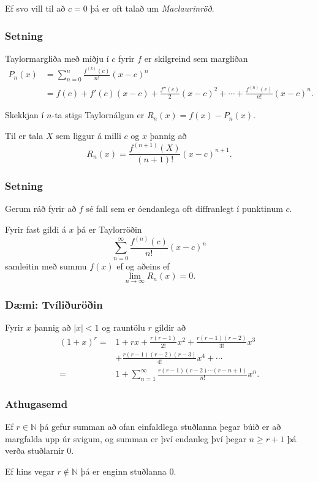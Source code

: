 \documentclass[icelandic,a4paper,12pt]{article}
\newcommand{\N}{{\mathbb  N}}
\begin{document}
Ef svo vill til að $c=0$ þá er oft talað um \emph{Maclaurinröð}.

\subsubsection{Setning}  
Taylormargliða með miðju í $c$ fyrir $f$ er skilgreind sem margliðan
\begin{align*}
  P_n(x)& =\sum_{n=0}^n \frac{f^{(k)}(c)}{n!}(x-c)^n \\
  &=f(c)+f'(c)(x-c)+ \frac{f''(c)}{2}(x-c)^2+\cdots+\frac{f^{(n)}(c)}{n!}(x-c)^n.
\end{align*}

Skekkjan í $n$-ta stigs Taylornálgun er $R_n(x)=f(x)-P_n(x)$.  

Til er tala $X$ sem liggur á milli $c$ og $x$ þannig að 
$$
R_n(x)=\frac{f^{(n+1)}(X)}{(n+1)!}(x-c)^{n+1}.
$$

\subsubsection{Setning}  
Gerum ráð fyrir að $f$ sé fall sem er óendanlega oft diffranlegt í punktinum $c$. 

Fyrir fast gildi á $x$ þá er Taylorröðin 
$$
\sum_{n=0}^\infty \frac{f^{(n)}(c)}{n!}(x-c)^n
$$ 
samleitin með summu $f(x)$  ef og aðeins ef 
$$
\lim_{n\rightarrow\infty}R_n(x)=0.
$$

\subsubsection{Dæmi: Tvíliðuröðin}
Fyrir $x$ þannig að $|x|<1$ og rauntölu $r$ gildir að 
\begin{align*}
(1+x)^r =& 1+rx+\frac{r(r-1)}{2!}x^2+ \frac{r(r-1)(r-2)}{3!}x^3 \\ 
&+\frac{r(r-1)(r-2)(r-3)}{4!}x^4+\cdots\\
=& 1+ \sum_{n=1}^\infty \frac{r(r-1)(r-2)\cdots(r-n+1)}{n!}x^n.
\end{align*}

\subsubsection{Athugasemd}
Ef $r \in \N$ þá gefur summan að ofan einfaldlega stuðlanna þegar búið er að 
margfalda upp úr svigum, og summan er því endanleg því þegar $n \geq r+1$ þá
verða stuðlarnir 0.

Ef hins vegar $r\notin \N$ þá er enginn stuðlanna 0.
\end{document}
